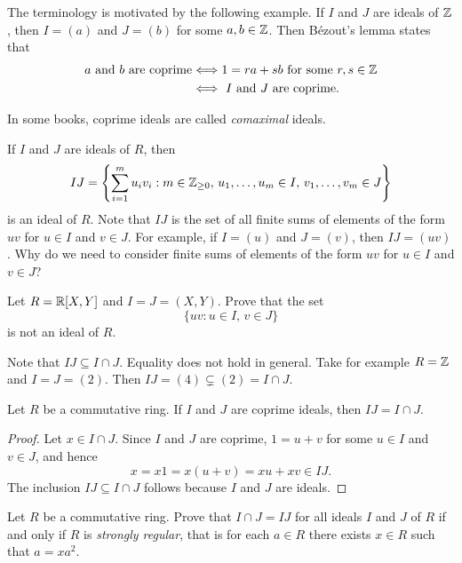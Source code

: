 The terminology is motivated by the following example. If $I$ and $J$ are
ideals of $\mathbb{Z}$, then $I=(a)$ and $J=(b)$ for some $a,b\in\mathbb{Z}$. Then Bézout's lemma  
states that 
\begin{align*}
\text{$a$ and $b$ are coprime}
&\Longleftrightarrow 1=ra+sb\text{ for some $r,s\in\mathbb{Z}$}\\
&\Longleftrightarrow\text{ $I$ and $J$ are coprime.}
\end{align*}

In some books, coprime ideals are called \emph{comaximal} ideals. 

If $I$ and $J$ are ideals of $R$, then 
\[
	IJ=\left\{\sum_{i=1}^mu_iv_i:m\in\mathbb{Z}_{\geq0},\,u_1,\dots,u_m\in I,\,v_1,\dots,v_m\in J\right\}
\]
is an ideal of $R$. Note that 
$IJ$ is the set of all finite sums of elements of the form $uv$ for $u\in I$ and $v\in J$. 
For example, if $I=(u)$ and $J=(v)$, then $IJ=(uv)$. 
Why do we need to consider finite sums of elements of the form $uv$
for $u\in I$ and $v\in J$?

\begin{exercise}
    \label{xca:IJ}
    Let $R=\mathbb{R}[X,Y]$ and $I=J=(X,Y)$. Prove that the
    set \[
    \{uv:u\in I,\,v\in J\}
    \]
    is not an ideal of $R$.
\end{exercise}

Note that $IJ\subseteq I\cap J$. Equality does not hold in general. Take
for example $R=\mathbb{Z}$ and $I=J=(2)$. Then $IJ=(4)\subsetneq (2)=I\cap J$. 

\begin{proposition}
Let $R$ be a commutative ring. If $I$ and $J$ are coprime ideals, then
$IJ=I\cap J$. 	
\end{proposition}

\begin{proof}
Let $x\in I\cap J$. Since $I$ and $J$ are coprime, 
$1=u+v$ for some $u\in I$ and $v\in J$, and hence 
\[ 
x=x1=x(u+v)=xu+xv\in IJ.
\]
The inclusion $IJ\subseteq I\cap J$ follows because $I$ and $J$ are ideals. 
\end{proof}

\begin{bonus}
\label{xca:strongly_regular}
    Let $R$ be a commutative ring. 
    Prove that $I\cap J=IJ$ 
    for all ideals $I$ and $J$ of $R$
    if and only if $R$ is \emph{strongly regular}, 
    that is  
    for each $a\in R$ there 
    exists $x\in R$ such that $a=xa^2$. 
\end{bonus}

